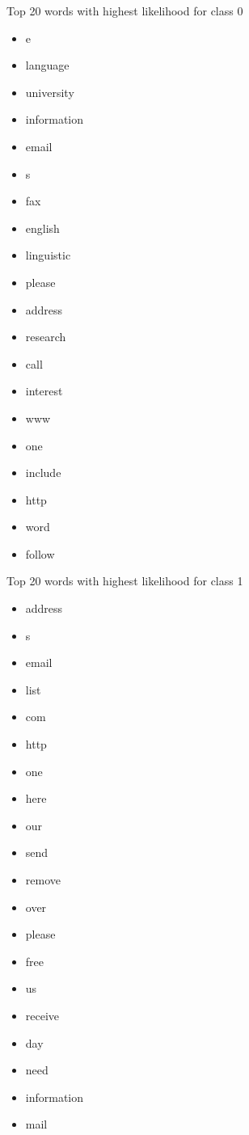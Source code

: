\begin{multicols*}{2}
Top 20 words with highest likelihood for class 0
\begin{itemize}
  \item e
  \item language
  \item university
  \item information
  \item email
  \item s
  \item fax
  \item english
  \item linguistic
  \item please
  \item address
  \item research
  \item call
  \item interest
  \item www
  \item one
  \item include
  \item http
  \item word
  \item follow
\end{itemize}

Top 20 words with highest likelihood for class 1
\begin{itemize}
  \item address
  \item s
  \item email
  \item list
  \item com
  \item http
  \item one
  \item here
  \item our
  \item send
  \item remove
  \item over
  \item please
  \item free
  \item us
  \item receive
  \item day
  \item need
  \item information
  \item mail
\end{itemize}
\end{multicols*}

